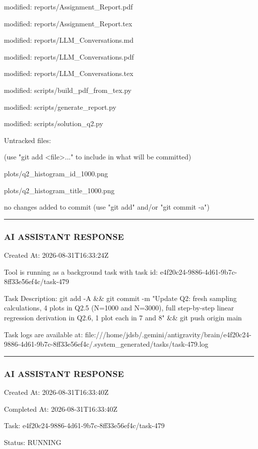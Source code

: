\documentclass[11pt,a4paper]{article}
\begin{document}
modified:   reports/Assignment\_Report.pdf

modified:   reports/Assignment\_Report.tex

modified:   reports/LLM\_Conversations.md

modified:   reports/LLM\_Conversations.pdf

modified:   reports/LLM\_Conversations.tex

modified:   scripts/build\_pdf\_from\_tex.py

modified:   scripts/generate\_report.py

modified:   scripts/solution\_q2.py


Untracked files:

(use "git add <file>..." to include in what will be committed)

plots/q2\_histogram\_id\_1000.png

plots/q2\_histogram\_title\_1000.png


no changes added to commit (use "git add" and/or "git commit -a")


\hrule

\subsubsection{AI ASSISTANT RESPONSE}

Created At: 2026-08-31T16:33:24Z

Tool is running as a background task with task id: e4f20c24-9886-4d61-9b7c-8ff33e56ef4c/task-479

Task Description: git add -A \&\& git commit -m "Update Q2: fresh sampling calculations, 4 plots in Q2.5 (N=1000 and N=3000), full step-by-step linear regression derivation in Q2.6, 1 plot each in 7 and 8" \&\& git push origin main

Task logs are available at: file:///home/jdsb/.gemini/antigravity/brain/e4f20c24-9886-4d61-9b7c-8ff33e56ef4c/.system\_generated/tasks/task-479.log


\hrule

\subsubsection{AI ASSISTANT RESPONSE}

Created At: 2026-08-31T16:33:40Z

Completed At: 2026-08-31T16:33:40Z

Task: e4f20c24-9886-4d61-9b7c-8ff33e56ef4c/task-479

Status: RUNNING
\end{document}
